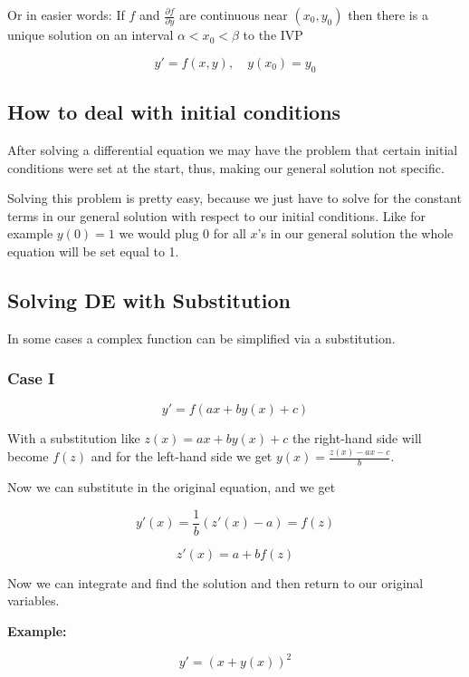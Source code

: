 Or in easier words: If \(f\) and \(\frac{\partial f}{\partial y}\) are continuous near \((x_0, y_0)\) 
then there is a unique solution on an interval \(\alpha < x_0 < \beta\) to the IVP

\[
    y' = f(x,y), \quad y(x_0) = y_0
\]

\subsection{How to deal with initial conditions}

After solving a differential equation we may have the problem that certain initial
conditions were set at the start, thus, making our general solution not specific.
\vspace{\baselineskip}

Solving this problem is pretty easy, because we just have to solve for the constant terms
in our general solution with respect to our initial conditions. Like for example \(y(0) = 1\)
we would plug 0 for all \(x\)'s in our general solution the whole equation will be set equal to 1.

\subsection{Solving DE with Substitution}

In some cases a complex function can be simplified via a substitution.

\subsubsection{Case I}

\[
    y' = f(ax + by(x) + c)
\]

With a substitution like \(z(x) = ax + by(x) + c\) the right-hand side will become \(f(z)\)
and for the left-hand side we get \(y(x) = \frac{z(x) - ax - c}{b}\).
\vspace{\baselineskip}

Now we can substitute in the original equation, and we get

\[
    y'(x) = \frac{1}{b} (z'(x) - a) = f(z)
\]

\[
    z'(x) = a + b f(z)
\]

Now we can integrate and find the solution and then return to our original variables.
\vspace{\baselineskip}

\textbf{Example:}

\[
    y' = (x + y(x))^2
\]

